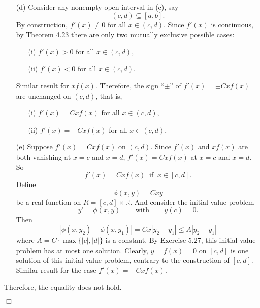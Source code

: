 \documentclass{article}
\begin{document}
\begin{enumerate}
\begin{enumerate}
  \item[(d)]
    Consider any nonempty open interval in (c), say
    \[
      (c,d) \subseteq [a,b].
    \]
    By construction, $f'(x) \neq 0$ for all $x \in (c,d)$.
    Since $f'(x)$ is continuous, by Theorem 4.23
    there are only two mutually exclusive possible cases:
    \begin{enumerate}
      \item[(i)]
      $f'(x) > 0$ for all $x \in (c,d)$,

      \item[(ii)]
      $f'(x) < 0$ for all $x \in (c,d)$.
    \end{enumerate}
    Similar result for $xf(x)$.
    Therefore, the sign ``$\pm$'' of $f'(x) = \pm C x f(x)$ are unchanged on $(c,d)$,
    that is,
    \begin{enumerate}
      \item[(i)]
      $f'(x) = C x f(x)$ for all $x \in (c,d)$,

      \item[(ii)]
      $f'(x) = -C x f(x)$ for all $x \in (c,d)$,
    \end{enumerate}

  \item[(e)]
    Suppose $f'(x) = C xf(x)$ on $(c,d)$.
    Since $f'(x)$ and $xf(x)$ are both vanishing at $x = c$ and $x = d$,
    $f'(x) = C xf(x)$ at $x = c$ and $x = d$.
    So
    \[
      f'(x) = C xf(x) \:\text{ if }\: x \in [c,d].
    \]
    Define
    \[
      \phi(x,y) = Cxy
    \]
    be a real function on $R = [c,d] \times \mathbb{R}$.
    And consider the initial-value problem
    \[
      y' = \phi(x,y)
      \:\:\:\:\:\:\:\:
      \text{ with }
      \:\:\:\:\:\:\:\:
      y(c) = 0.
    \]
    Then
    \[
      |\phi(x,y_2) - \phi(x,y_1)|
      = Cx|y_2-y_1|
      \leq A|y_2-y_1|
    \]
    where $A = C \cdot \max\{|c|,|d|\}$ is a constant.
    By Exercise 5.27, this initial-value problem has at most one solution.
    Clearly, $y = f(x) = 0$ on $[c,d]$ is one solution of this initial-value problem,
    contrary to the construction of $[c,d]$.
    Similar result for the case $f'(x) = -C xf(x)$.
  \end{enumerate}
  Therefore, the equality does not hold.
\end{enumerate}
$\Box$ \\\\



\end{document}
